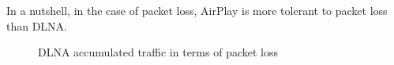 In a nutshell, in the case of packet loss, AirPlay is more tolerant to packet loss than DLNA.
\begin{figure}[hb]
\caption{DLNA accumulated traffic in terms of packet loss
\label{dlna_pl}}
\end{figure}

